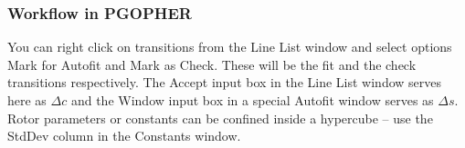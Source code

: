 \documentclass[11pt]{article}
\begin{document}

\subsubsection{Workflow in PGOPHER}



You can right click on transitions from the Line List window and select options Mark for Autofit and Mark as Check. These will be the fit and the check transitions respectively. The Accept input box in the Line List window serves here as $\Delta c$ and the Window input box in a special Autofit window serves as $\Delta s$. Rotor parameters or constants can be confined inside a hypercube -- use the StdDev column in the Constants window.
\end{document}
